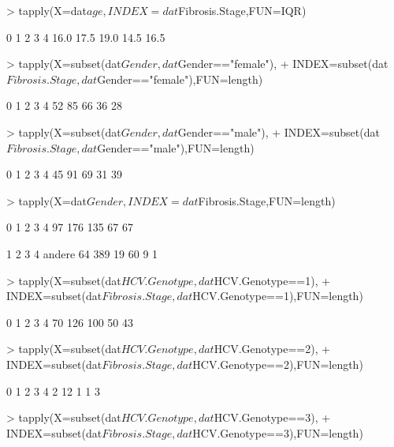 \documentclass{article}
\begin{document}
\begin{enumerate}
\begin{enumerate}
\begin{enumerate}
\begin{Schunk}
\begin{Sinput}
> tapply(X=dat$age,INDEX=dat$Fibrosis.Stage,FUN=IQR)
\end{Sinput}
\begin{Soutput}
   0    1    2    3    4 
16.0 17.5 19.0 14.5 16.5 
\end{Soutput}
\begin{Sinput}
> tapply(X=subset(dat$Gender,dat$Gender=="female"),
+        INDEX=subset(dat$Fibrosis.Stage,dat$Gender=="female"),FUN=length)
\end{Sinput}
\begin{Soutput}
 0  1  2  3  4 
52 85 66 36 28 
\end{Soutput}
\begin{Sinput}
> tapply(X=subset(dat$Gender,dat$Gender=="male"),
+        INDEX=subset(dat$Fibrosis.Stage,dat$Gender=="male"),FUN=length)
\end{Sinput}
\begin{Soutput}
 0  1  2  3  4 
45 91 69 31 39 
\end{Soutput}
\begin{Sinput}
> tapply(X=dat$Gender,INDEX=dat$Fibrosis.Stage,FUN=length)
\end{Sinput}
\begin{Soutput}
  0   1   2   3   4 
 97 176 135  67  67 
\end{Soutput}
\begin{Soutput}
            1      2      3      4 andere 
    64    389     19     60      9      1 
\end{Soutput}
\begin{Sinput}
> tapply(X=subset(dat$HCV.Genotype,dat$HCV.Genotype==1),
+        INDEX=subset(dat$Fibrosis.Stage,dat$HCV.Genotype==1),FUN=length)
\end{Sinput}
\begin{Soutput}
  0   1   2   3   4 
 70 126 100  50  43 
\end{Soutput}
\begin{Sinput}
> tapply(X=subset(dat$HCV.Genotype,dat$HCV.Genotype==2),
+        INDEX=subset(dat$Fibrosis.Stage,dat$HCV.Genotype==2),FUN=length)
\end{Sinput}
\begin{Soutput}
 0  1  2  3  4 
 2 12  1  1  3 
\end{Soutput}
\begin{Sinput}
> tapply(X=subset(dat$HCV.Genotype,dat$HCV.Genotype==3),
+        INDEX=subset(dat$Fibrosis.Stage,dat$HCV.Genotype==3),FUN=length)

\end{Sinput}
\end{Schunk}
\end{enumerate}
\end{enumerate}
\end{enumerate}
\end{document}
